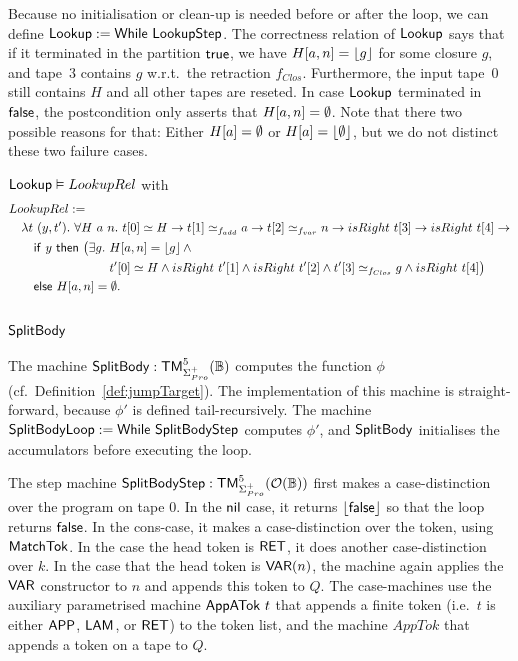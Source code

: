 Because no initialisation or clean-up is needed before or after the loop, we can define $\mathsf{Lookup} := \mathsf{While}~\mathsf{LookupStep}$.  The correctness
relation of $\mathsf{Lookup}$ says that if it terminated in the partition $\mathsf{true}$, we have $H[a,n] = \left\lfloor {g} \right\rfloor$ for some closure $g$, and tape~$3$ contains
$g$ w.r.t.\ the retraction $f_{Clos}$.  Furthermore, the input tape~$0$ still contains $H$ and all other tapes are reseted.  In case $\mathsf{Lookup}$
terminated in $\mathsf{false}$, the postcondition only asserts that $H[a,n]=\emptyset$.  Note that there two possible reasons for that: Either $H[a]=\emptyset$ or
$H[a]=\left\lfloor {\emptyset} \right\rfloor$, but we do not distinct these two failure cases.

\begin{lemma}
  \label{lem:Lookup_Realise}
  $\mathsf{Lookup} \mathrel{\vDash} LookupRel$
  with
  \small
  \begin{alignat*}{1}
    & LookupRel := \\
    &\quad \lambda t~(y, t').~\forall H~a~n.~ t[0] \simeq H \rightarrow t[1] \simeq_{f_{add}} a \rightarrow t[2] \simeq_{f_{var}} n \rightarrow isRight~t[3] \rightarrow isRight~t[4] \rightarrow \\
    &\quad\quad \MS{if}~y~\MS{then}~\bigl(\exists g.~H[a,n] = \Some{g} \land \\
    &\quad\quad \phantom{\MS{if}~y~\MS{then}~\bigl(\exists g.~} t'[0] \simeq H \land isRight~t'[1] \land isRight~t'[2] \land t'[3] \simeq_{f_{Clos}} g \land isRight~t[4]\bigr) \\
    &\quad\quad \MS{else}~ H[a,n] = \None.
\end{alignat*}
\end{lemma}


\subsection{$\mathsf{SplitBody}$}
\label{sec:SplitBody}

The machine $\mathsf{SplitBody} : \mathsf{TM}_{\Sigma^+_{Pro}}^5(\mathbb{B})$ computes the function $\phi$ (cf.\ Definition~\ref{def:jumpTarget}).  The
implementation of this machine is straight-forward, because $\phi'$ is defined tail-recursively.  The machine
$\mathsf{SplitBodyLoop} := \mathsf{While}~\mathsf{SplitBodyStep}$ computes $\phi'$, and $\mathsf{SplitBody}$ initialises the accumulators before executing the loop.

The step machine $\mathsf{SplitBodyStep} : \mathsf{TM}_{\Sigma^+_{Pro}}^5(\mathcal{O}(\mathbb{B}))$ first makes a case-distinction over the program on tape $0$.  In the
$\mathsf{nil}$ case, it returns $\left\lfloor {\ensuremath{\mathsf{false}}} \right\rfloor$ so that the loop returns $\mathsf{false}$.  In the cons-case, it makes a case-distinction over the token, using
$\mathsf{MatchTok}$.  In the case the head token is $\mathsf{RET}$, it does another case-distinction over $k$.  In the case that the head token is
$\mathsf{VAR}(n)$, the machine again applies the $\mathsf{VAR}$ constructor to $n$ and appends this token to $Q$.  The case-machines use the auxiliary
parametrised machine $\mathsf{AppATok}~t$ that appends a finite token (i.e.\ $t$ is either $\mathsf{APP}$, $\mathsf{LAM}$, or $\mathsf{RET}$) to the token list, and
the machine $AppTok$ that appends a token on a tape to $Q$.


